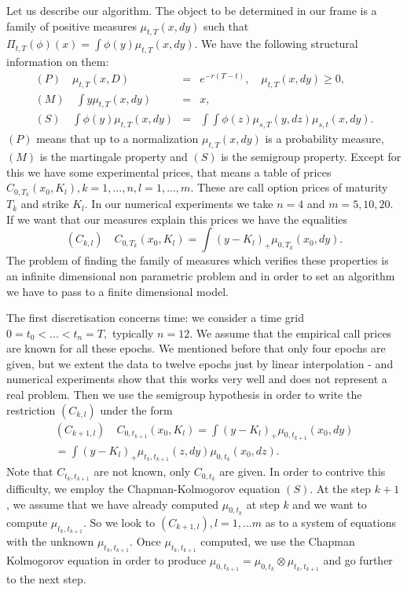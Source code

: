 \documentclass[a4paper]{article}
\begin{document}
Let us describe our algorithm. The object to be determined in our
frame is a family of positive measures $\mu _{t,T}(x,dy)$ such
that $\Pi _{t,T}(\phi )(x)=\int \phi (y)\mu _{t,T}(x,dy)$. We have
the following structural information on them:
\begin{eqnarray*}
(P)\quad \mu _{t,T}(x,D) &=&e^{-r(T-t)},\quad \mu _{t,T}(x,dy)\geq 0, \\
(M)\quad \int y\mu _{t,T}(x,dy) &=&x, \\
(S)\quad \int \phi (y)\mu _{t,T}(x,dy) &=&\int \int \phi (z)\mu
_{s,T}(y,dz)\mu _{s,t}(x,dy).
\end{eqnarray*}
$(P)$ means that up to a normalization $\mu _{t,T}(x,dy)$ is a
probability measure, $(M)$ is the martingale property and $(S)$ is
the semigroup property. Except for this we have some experimental
prices, that means a table of prices
$C_{0,T_{k}}(x_{0},K_{l}),k=1,...,n,l=1,...,m.$ These are call
option prices of maturity $T_{k}$ and strike $K_{l}.$ In our
numerical experiments we take $n=4$ and $m=5,10,20.$ If we want
that our measures explain this prices we have the equalities
\[
(C_{k,l})\quad C_{0,T_{k}}(x_{0},K_{l})=\int (y-K_{l})_{+}\mu
_{0,T_{k}}(x_{0},dy).
\]
The problem of finding the family of measures which verifies these
properties is an infinite dimensional non parametric problem and
in order to set an algorithm we have to pass to a finite
dimensional model.

The first discretisation concerns time: we consider a time grid $%
0=t_{0}<...<t_{n}=T,$ typically $n=12.$ We assume that the
empirical call prices are known for all these epochs. We mentioned
before that only four epochs are given, but we extent the data to
twelve epochs just by linear interpolation - and numerical
experiments show that this works very well and does not represent
a real problem. Then we use the semigroup hypothesis in order to
write the restriction $(C_{k,l})$ under the form
\begin{multline*} (C_{k+1,l})\quad
C_{0,t_{k+1}}(x_{0},K_{l})=\int (y-K_{l})_{+}\mu
_{0,t_{k+1}}(x_{0},dy)\\ =\int (y-K_{l})_{+}\mu
_{t_{k},t_{k+1}}(z,dy)\mu _{0,t_{k}}(x_{0},dz).
\end{multline*}
Note that $C_{t_{k},t_{k+1}}$ are not known, only $C_{0,t_{k}}$
are given. In order to contrive this difficulty, we employ the
Chapman-Kolmogorov equation $(S)$. At the step $k+1$, we assume
that we have already computed $\mu _{0,t_{k}}$ at step $k$ and we
want to compute $\mu _{t_{k},t_{k+1}}.$ So we look to
$(C_{k+1,l}),l=1,...m$ as to a system of equations with the
unknown $\mu _{t_{k},t_{k+1}}.$ Once $\mu _{t_{k},t_{k+1}} $
computed, we use the Chapman Kolmogorov equation in order to
produce $\mu _{0,t_{k+1}}=\mu _{0,t_{k}}\otimes \mu
_{t_{k},t_{k+1}}$ and go further to the next step.
\end{document}
